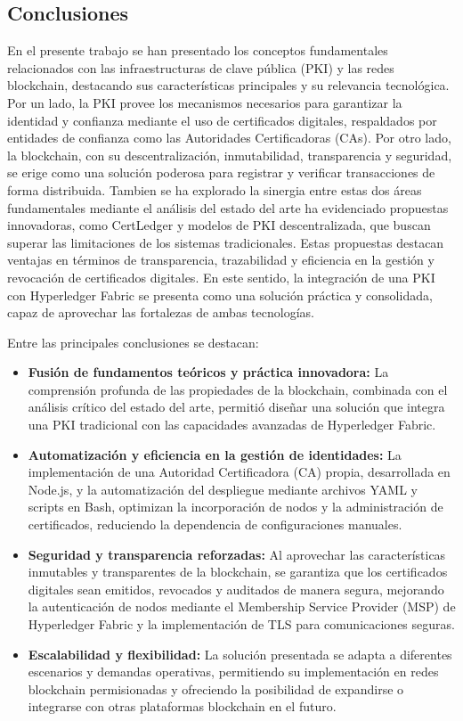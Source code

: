 \begin{conclusions}
    \section{Conclusiones}

    En el presente trabajo se han presentado los conceptos fundamentales relacionados con las infraestructuras de clave pública (PKI) y las redes blockchain, destacando sus características principales y su relevancia tecnológica. Por un lado, la PKI provee los mecanismos necesarios para garantizar la identidad y confianza mediante el uso de certificados digitales, respaldados por entidades de confianza como las Autoridades Certificadoras (CAs). Por otro lado, la blockchain, con su descentralización, inmutabilidad, transparencia y seguridad, se erige como una solución poderosa para registrar y verificar transacciones de forma distribuida. 
    Tambien se ha explorado la sinergia entre estas dos áreas fundamentales mediante el análisis del estado del arte ha evidenciado propuestas innovadoras, como CertLedger y modelos de PKI descentralizada, que buscan superar las limitaciones de los sistemas tradicionales. Estas propuestas destacan ventajas en términos de transparencia, trazabilidad y eficiencia en la gestión y revocación de certificados digitales. En este sentido, la integración de una PKI con Hyperledger Fabric se presenta como una solución práctica y consolidada, capaz de aprovechar las fortalezas de ambas tecnologías.
    
    Entre las principales conclusiones se destacan:
    
    \begin{itemize}
        \item \textbf{Fusión de fundamentos teóricos y práctica innovadora:} La comprensión profunda de las propiedades de la blockchain, combinada con el análisis crítico del estado del arte, permitió diseñar una solución que integra una PKI tradicional con las capacidades avanzadas de Hyperledger Fabric.
        \item \textbf{Automatización y eficiencia en la gestión de identidades:} La implementación de una Autoridad Certificadora (CA) propia, desarrollada en Node.js, y la automatización del despliegue mediante archivos YAML y scripts en Bash, optimizan la incorporación de nodos y la administración de certificados, reduciendo la dependencia de configuraciones manuales.
        \item \textbf{Seguridad y transparencia reforzadas:} Al aprovechar las características inmutables y transparentes de la blockchain, se garantiza que los certificados digitales sean emitidos, revocados y auditados de manera segura, mejorando la autenticación de nodos mediante el Membership Service Provider (MSP) de Hyperledger Fabric y la implementación de TLS para comunicaciones seguras.
        \item \textbf{Escalabilidad y flexibilidad:} La solución presentada se adapta a diferentes escenarios y demandas operativas, permitiendo su implementación en redes blockchain permisionadas y ofreciendo la posibilidad de expandirse o integrarse con otras plataformas blockchain en el futuro.
    \end{itemize}
    

\end{conclusions}
